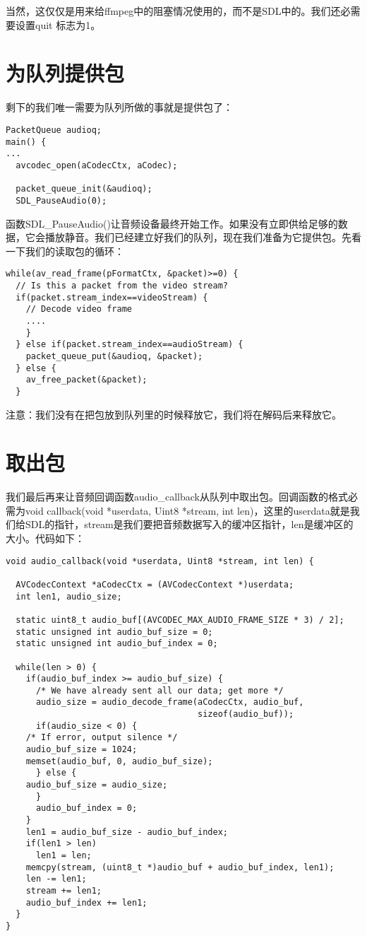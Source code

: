 当然，这仅仅是用来给ffmpeg中的阻塞情况使用的，而不是SDL中的。我们还必需要设置quit 标志为1。

\section{为队列提供包}


剩下的我们唯一需要为队列所做的事就是提供包了：

\begin{lstlisting}
PacketQueue audioq;
main() {
...
  avcodec_open(aCodecCtx, aCodec);

  packet_queue_init(&audioq);
  SDL_PauseAudio(0);
\end{lstlisting}

函数SDL_PauseAudio()让音频设备最终开始工作。如果没有立即供给足够的数据，它会播放静音。我们已经建立好我们的队列，现在我们准备为它提供包。先看一下我们的读取包的循环：

\begin{lstlisting}
while(av_read_frame(pFormatCtx, &packet)>=0) {
  // Is this a packet from the video stream?
  if(packet.stream_index==videoStream) {
    // Decode video frame
    ....
    }
  } else if(packet.stream_index==audioStream) {
    packet_queue_put(&audioq, &packet);
  } else {
    av_free_packet(&packet);
  }
\end{lstlisting}

注意：我们没有在把包放到队列里的时候释放它，我们将在解码后来释放它。

\section{取出包}

我们最后再来让音频回调函数audio_callback从队列中取出包。回调函数的格式必需为void callback(void *userdata, Uint8 *stream, int len)，这里的userdata就是我们给SDL的指针，stream是我们要把音频数据写入的缓冲区指针，len是缓冲区的大小。代码如下：

\begin{lstlisting}
void audio_callback(void *userdata, Uint8 *stream, int len) {

  AVCodecContext *aCodecCtx = (AVCodecContext *)userdata;
  int len1, audio_size;

  static uint8_t audio_buf[(AVCODEC_MAX_AUDIO_FRAME_SIZE * 3) / 2];
  static unsigned int audio_buf_size = 0;
  static unsigned int audio_buf_index = 0;

  while(len > 0) {
    if(audio_buf_index >= audio_buf_size) {
      /* We have already sent all our data; get more */
      audio_size = audio_decode_frame(aCodecCtx, audio_buf,
                                      sizeof(audio_buf));
      if(audio_size < 0) {
    /* If error, output silence */
    audio_buf_size = 1024;
    memset(audio_buf, 0, audio_buf_size);
      } else {
    audio_buf_size = audio_size;
      }
      audio_buf_index = 0;
    }
    len1 = audio_buf_size - audio_buf_index;
    if(len1 > len)
      len1 = len;
    memcpy(stream, (uint8_t *)audio_buf + audio_buf_index, len1);
    len -= len1;
    stream += len1;
    audio_buf_index += len1;
  }
}
\end{lstlisting}


